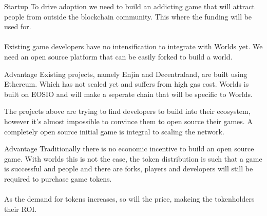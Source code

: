 \documentclass[aspectratio=169]{beamer}
\begin{document}
\begin{frame}{Startup}
    To drive adoption we need to build an addicting game that will attract people
    from outside the blockchain community. This where the funding will be used for.
    \\~\\
    Existing game developers have no intensification to integrate with Worlds
    yet.  We need an open source platform that can be easily forked to build a
    world.
\end{frame}

\begin{frame}{Advantage}
    Existing projects, namely Enjin and Decentraland, are built using Ethereum. Which
    has not scaled yet and suffers from high gas cost. Worlds is built on EOSIO and will
    make a seperate chain that will be specific to Worlds.

    The projects above are trying to find developers to build into their ecosystem, however
    it's almost impossible to convince them to open source their games. A completely open
    source initial game is integral to scaling the network.
\end{frame}

\begin{frame}{Advantage}
    Traditionally there is no economic incentive to build an open source game. With worlds
    this is not the case, the token distribution is such that a game is successful and people
    and there are forks, players and developers will still be required to purchase game tokens.
    \\~\\
    As the demand for tokens increases, so will the price, makeing the tokenholders their ROI.
\end{frame}
\end{document}
